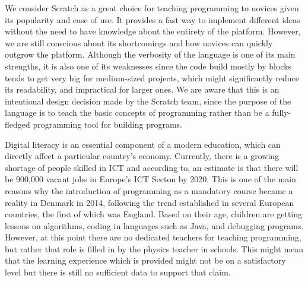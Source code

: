 We consider Scratch as a great choice for teaching programming to novices given its popularity and ease of use. It provides a fast way to implement different ideas without the need to have knowledge about the entirety of the platform. However, we are still conscious about its shortcomings and how novices can quickly outgrow the platform. Although the verbosity of the language is one of its main strengths, it is also one of its weaknesses since the code build mostly by blocks tends to get very big for medium-sized projects, which might significantly reduce its readability, and impractical for larger ones. We are aware that this is an intentional design decision made by the Scratch team, since the purpose of the language is to teach the basic concepts of programming rather than be a fully-fledged programming tool for building programs. 




Digital literacy is an essential component of a modern education, which can directly affect a particular country's economy. Currently, there is a growing shortage of people skilled in ICT and according to\cite{pretz14}, an estimate is that there will be 900,000 vacant jobs in Europe's ICT Secton by 2020. This is one of the main reasons why the introduction of programming as a mandatory course became a reality in Denmark in 2014, following the trend established in several European countries, the first of which was England. Based on their age, children are getting lessons on algorithms, coding in languages such as Java, and debugging programs. However, at this point there are no dedicated teachers for teaching programming, but rather that role is filled in by the physics teacher in schools. This might mean that the learning experience which is provided might not be on a satisfactory level but there is still no sufficient data to support that claim.



